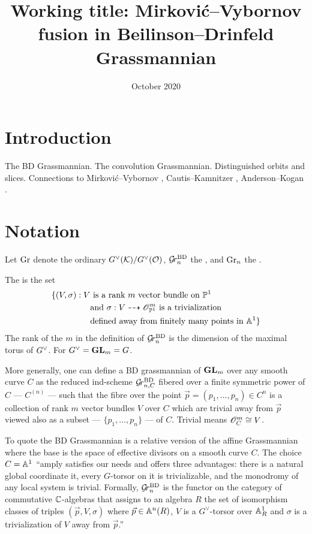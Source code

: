 \documentclass{article}
\title{Working title: Mirkovi\'c--Vybornov fusion in Beilinson--Drinfeld Grassmannian}
\date{October 2020}
\newcommand{\anne}[2]{\colorbox{pink!75!blue}{#1}\marginpar[]{\tiny\textbf{\color{pink!50!blue}#2}}}
\begin{document}
\maketitle

\section{Introduction}

The BD Grassmannian. The convolution Grassmannian. Distinguished orbits and slices. Connections to Mirkovi\'c--Vybornov \cite{mirkovic2007quiver,mirkovic2019comparison}, Cautis--Kamnitzer \cite{cautis2018categorical}, Anderson--Kogan \cite{anderson2005algebra}.

\section{Notation}

Let $\Gr$ denote the ordinary  $\Gch(\cK)/\Gch(\cO)$, $\Grbd$ the , and $\Grc$ the . 

\begin{definition}
    The  is the set 
    \begin{equation}
        \label{eq:grbd}
    \begin{aligned}
        \{(V,\sigma) : V &\text{ is a rank } m \text{ vector bundle on }\PP^1 \\ &\text{and } \sigma: V \dashrightarrow \scO_{\PP^1}^m \text{ is a trivialization} \\
        &\text{defined away from finitely many points in }\AA^1\}
    \end{aligned}
    \end{equation}
    The rank of the $m$ in the definition of $\Grbd$ is the dimension of the maximal torus of $\Gch$. For $\Gch =\GL_m = G$. 

    More generally, one can define a BD grassmannian of $\GL_m$ over any smooth curve $C$ as the reduced ind-scheme $\Grbd[n,C]$ fibered over a finite symmetric power of $C$ --- $C^{(n)}$ --- such that the fibre over the point $\vec p = (p_1,\dots,p_n)\in C^n$ is a collection of rank $m$ vector bundles $V$ over $C$ which are trivial away from $\vec p$ viewed also as a subset --- $\{p_1,\dots,p_n\}$ --- of $C$. Trivial means $\scO_C^m\cong V$. 
\end{definition}

To quote \cite{baumann2020bases} the BD Grassmannian is a relative version of the affine Grassmannian where the base is the space of effective divisors on a smooth curve $C$. The choice $C = \AA^1$ ``amply satisfies our needs and offers three advantages: there is a natural global coordinate it, every \anne{$G$-torsor}{i.e. principal $G$ bundle?} on it is trivializable, and the monodromy of any local system is trivial. Formally, $\Grbd$ is the functor on the category of commutative $\CC$-algebras that assigns to an algebra $R$ the set of isomorphism classes of triples $(\vec p,V,\sigma)$ where $\vec p\in \AA^n(R)$, $V$ is a $G^\vee$-torsor over $\AA^1_R$ and $\sigma$ is a trivialization of $V$ away from $\vec p$.''  
\end{document}
